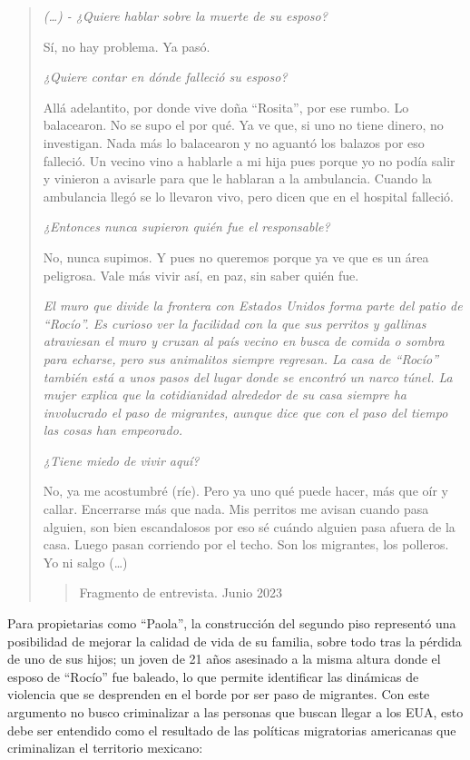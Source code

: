 \documentclass[
  spanish,
  11pt,
  a4paper,
]{scrbook}
\begin{document}
\begin{quote}
\emph{(\ldots) - ¿Quiere hablar sobre la muerte de su esposo?}

Sí, no hay problema. Ya pasó.

\emph{¿Quiere contar en dónde falleció su esposo?}

Allá adelantito, por donde vive doña ``Rosita'', por ese rumbo. Lo
balacearon. No se supo el por qué. Ya ve que, si uno no tiene dinero, no
investigan. Nada más lo balacearon y no aguantó los balazos por eso
falleció. Un vecino vino a hablarle a mi hija pues porque yo no podía
salir y vinieron a avisarle para que le hablaran a la ambulancia. Cuando
la ambulancia llegó se lo llevaron vivo, pero dicen que en el hospital
falleció.

\emph{¿Entonces nunca supieron quién fue el responsable?}

No, nunca supimos. Y pues no queremos porque ya ve que es un área
peligrosa. Vale más vivir así, en paz, sin saber quién fue.

\emph{El muro que divide la frontera con Estados Unidos forma parte del
patio de ``Rocío''. Es curioso ver la facilidad con la que sus perritos
y gallinas atraviesan el muro y cruzan al país vecino en busca de comida
o sombra para echarse, pero sus animalitos siempre regresan. La casa de
``Rocío'' también está a unos pasos del lugar donde se encontró un narco
túnel. La mujer explica que la cotidianidad alrededor de su casa siempre
ha involucrado el paso de migrantes, aunque dice que con el paso del
tiempo las cosas han empeorado.}

\emph{¿Tiene miedo de vivir aquí?}

No, ya me acostumbré (ríe). Pero ya uno qué puede hacer, más que oír y
callar. Encerrarse más que nada. Mis perritos me avisan cuando pasa
alguien, son bien escandalosos por eso sé cuándo alguien pasa afuera de
la casa. Luego pasan corriendo por el techo. Son los migrantes, los
polleros. Yo ni salgo (\ldots)

\begin{quote}
Fragmento de entrevista. Junio 2023
\end{quote}
\end{quote}

Para propietarias como ``Paola'', la construcción del segundo piso
representó una posibilidad de mejorar la calidad de vida de su familia,
sobre todo tras la pérdida de uno de sus hijos; un joven de 21 años
asesinado a la misma altura donde el esposo de ``Rocío'' fue baleado, lo
que permite identificar las dinámicas de violencia que se desprenden en
el borde por ser paso de migrantes. Con este argumento no busco
criminalizar a las personas que buscan llegar a los EUA, esto debe ser
entendido como el resultado de las políticas migratorias americanas que
criminalizan el territorio mexicano:
\end{document}

